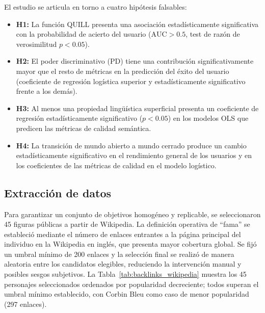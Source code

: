 \documentclass[../main.tex]{subfiles}
\begin{document}
El estudio se articula en torno a cuatro hipótesis falsables:

\begin{itemize}
    \item \textbf{H1:} La función QUILL presenta una asociación estadísticamente significativa con la probabilidad de acierto del usuario ($\text{AUC} > 0.5$, test de razón de verosimilitud $p < 0.05$).
    \item \textbf{H2:} El poder discriminativo (PD) tiene una contribución significativamente mayor que el resto de métricas en la predicción del éxito del usuario (coeficiente de regresión logística superior y estadísticamente significativo frente a los demás).
    \item \textbf{H3:} Al menos una propiedad lingüística superficial presenta un coeficiente de regresión estadísticamente significativo ($p < 0.05$) en los modelos OLS que predicen las métricas de calidad semántica.
    \item \textbf{H4:} La transición de mundo abierto a mundo cerrado produce un cambio estadísticamente significativo en el rendimiento general de los usuarios y en los coeficientes de las métricas de calidad en el modelo logístico.
\end{itemize}

\subsection{Extracción de datos}

Para garantizar un conjunto de objetivos homogéneo y replicable, se seleccionaron 45 figuras públicas a partir de Wikipedia. La definición operativa de ``fama'' se estableció mediante el número de enlaces entrantes a la página principal del individuo en la Wikipedia en inglés, que presenta mayor cobertura global. Se fijó un umbral mínimo de 200 enlaces y la selección final se realizó de manera aleatoria entre los candidatos elegibles, reduciendo la intervención manual y posibles sesgos subjetivos. La Tabla~\ref{tab:backlinks_wikipedia} muestra los 45 personajes seleccionados ordenados por popularidad decreciente; todos superan el umbral mínimo establecido, con Corbin Bleu como caso de menor popularidad (297 enlaces).
\end{document}
